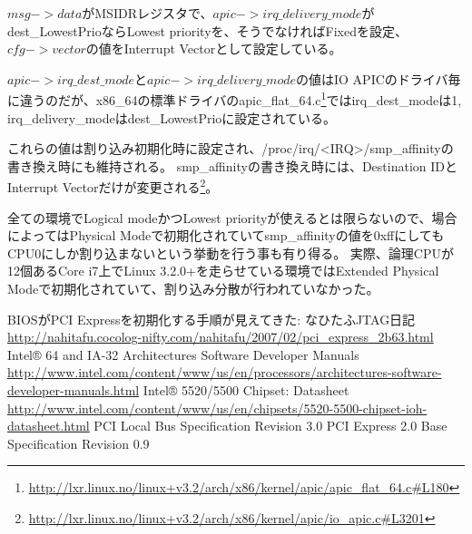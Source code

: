 $msg->data$がMSIDRレジスタで、$apic->irq\_delivery\_mode$がdest\_LowestPrioならLowest priorityを、そうでなければFixedを設定、$cfg->vector$の値をInterrupt Vectorとして設定している。

$apic->irq\_dest\_mode$と$apic->irq\_delivery\_mode$の値はIO APICのドライバ毎に違うのだが、x86\_64の標準ドライバのapic\_flat\_64.c\footnote{\url{http://lxr.linux.no/linux+v3.2/arch/x86/kernel/apic/apic\_flat\_64.c\#L180}}ではirq\_dest\_modeは1, irq\_delivery\_modeはdest\_LowestPrioに設定されている。

これらの値は割り込み初期化時に設定され、/proc/irq/<IRQ>/smp\_affinityの書き換え時にも維持される。
smp\_affinityの書き換え時には、Destination IDとInterrupt Vectorだけが変更される\footnote{\url{http://lxr.linux.no/linux+v3.2/arch/x86/kernel/apic/io\_apic.c\#L3201}}。

全ての環境でLogical modeかつLowest priorityが使えるとは限らないので、場合によってはPhysical Modeで初期化されていてsmp\_affinityの値を0xffにしてもCPU0にしか割り込まないという挙動を行う事も有り得る。
実際、論理CPUが12個あるCore i7上でLinux 3.2.0+を走らせている環境ではExtended Physical Modeで初期化されていて、割り込み分散が行われていなかった。

\begin{thebibliography}{5}
     BIOSがPCI Expressを初期化する手順が見えてきた: なひたふJTAG日記 \url{http://nahitafu.cocolog-nifty.com/nahitafu/2007/02/pci_express_2b63.html}
    \bibitem Intel® 64 and IA-32 Architectures Software Developer Manuals \url{http://www.intel.com/content/www/us/en/processors/architectures-software-developer-manuals.html}
    \bibitem Intel® 5520/5500 Chipset: Datasheet \url{http://www.intel.com/content/www/us/en/chipsets/5520-5500-chipset-ioh-datasheet.html}
    \bibitem PCI Local Bus Specification Revision 3.0
    \bibitem PCI Express 2.0 Base Specification Revision 0.9
\end{thebibliography}



